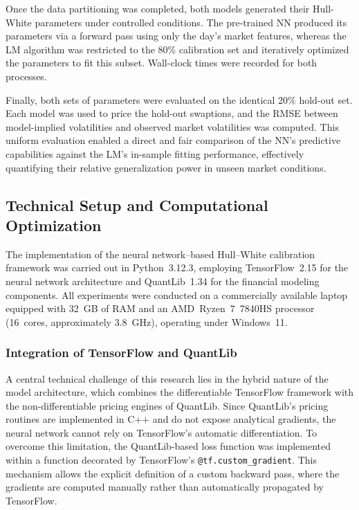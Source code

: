 {Once the data partitioning was completed, both models generated their Hull-White parameters under controlled conditions. The pre-trained NN produced its parameters via a forward pass using only the day’s market features, whereas the LM algorithm was restricted to the 80\% calibration set and iteratively optimized the parameters to fit this subset. Wall-clock times were recorded for both processes.  

Finally, both sets of parameters were evaluated on the identical 20\% hold-out set. Each model was used to price the hold-out swaptions, and the RMSE between model-implied volatilities and observed market volatilities was computed. This uniform evaluation enabled a direct and fair comparison of the NN’s predictive capabilities against the LM’s in-sample fitting performance, effectively quantifying their relative generalization power in unseen market conditions.

\subsection{Technical Setup and Computational Optimization}
\label{subsec:technical_setup}
The implementation of the neural network–based Hull–White calibration framework was carried out in Python~3.12.3, employing TensorFlow~2.15 for the neural network architecture and QuantLib~1.34 for the financial modeling components. All experiments were conducted on a commercially available laptop equipped with 32~GB of RAM and an AMD~Ryzen~7~7840HS processor (16~cores, approximately 3.8~GHz), operating under Windows~11.

\subsubsection{Integration of TensorFlow and QuantLib}
A central technical challenge of this research lies in the hybrid nature of the model architecture, which combines the differentiable TensorFlow framework with the non-differentiable pricing engines of QuantLib. Since QuantLib’s pricing routines are implemented in C++ and do not expose analytical gradients, the neural network cannot rely on TensorFlow’s automatic differentiation. To overcome this limitation, the QuantLib-based loss function was implemented within a function decorated by TensorFlow’s \texttt{@tf.custom\_gradient}. This mechanism allows the explicit definition of a custom backward pass, where the gradients are computed manually rather than automatically propagated by TensorFlow.

}
